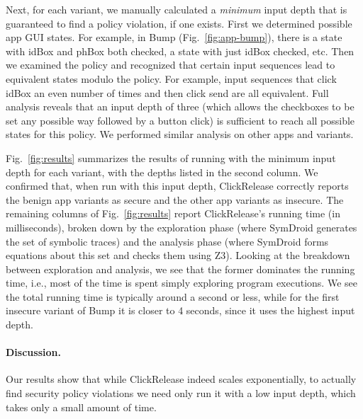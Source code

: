\documentclass{llncs}
\newcommand{\code}[1]{\textsf{#1}} %
\newcommand{\toolname}{ClickRelease\xspace}
\begin{document}
Next, for each variant, we manually
calculated a \emph{minimum} input depth that is guaranteed
to find a policy violation, if one exists.
First we determined possible app GUI states.
For example, in Bump (Fig.~\ref{fig:app-bump}), there is a state with \code{idBox} and
\code{phBox} both checked, a state with just \code{idBox} checked,
etc. Then we examined the policy and recognized that certain input
sequences lead to equivalent states modulo the policy.  For example,
input sequences that click \code{idBox} an even number of times and
then click send are all equivalent. Full analysis reveals that an
input depth of three (which allows the checkboxes to be set any
possible way followed by a button click) is
sufficient to reach all possible states for this policy. We performed
similar analysis on other apps and variants.

Fig.~\ref{fig:results} summarizes the results of running with
the minimum input depth for each variant, with the depths listed in
the second column.
We confirmed that, when run with this input depth, \toolname{}
correctly reports the benign app variants as secure and the other app
variants as insecure.
%
The remaining columns of Fig.~\ref{fig:results} report \toolname{}'s
running time (in milliseconds), broken down by the
exploration phase (where SymDroid generates the set of symbolic
traces) and the analysis phase (where SymDroid forms equations about
this set and checks them using Z3).  Looking at the breakdown between
exploration and analysis, we see that the former dominates the running
time, i.e., most of the time is spent simply exploring program
executions.  We see the total running time is typically around a
second or less, while for the first insecure variant of Bump it is
closer to 4 seconds, since it uses the highest input depth.

\paragraph*{Discussion.}

Our results show that while \toolname{} indeed scales exponentially,
to actually find security policy violations we need only run it with a
low input depth, which takes only a small amount of time.
\end{document}
